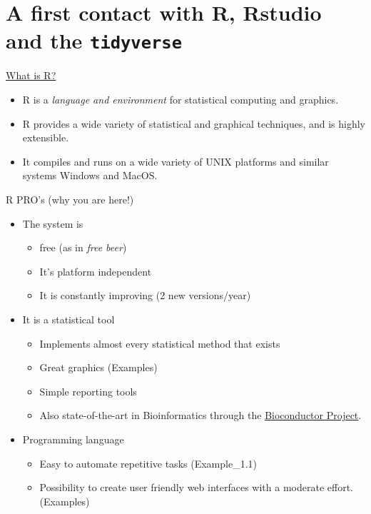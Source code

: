 \documentclass[ignorenonframetext,]{beamer}
\providecommand{\tightlist}{%
  \setlength{\itemsep}{0pt}\setlength{\parskip}{0pt}}
\begin{document}
\section{\texorpdfstring{A first contact with R, Rstudio and the
\texttt{tidyverse}}{A first contact with R, Rstudio and the tidyverse}}\label{a-first-contact-with-r-rstudio-and-the-tidyverse}

\begin{frame}{\href{https://www.r-project.org/about.html}{What is R?}}

\begin{itemize}
\item
  R is a \emph{language and environment} for statistical computing and
  graphics.
\item
  R provides a wide variety of statistical and graphical techniques, and
  is highly extensible.
\item
  It compiles and runs on a wide variety of UNIX platforms and similar
  systems Windows and MacOS.
\end{itemize}

\end{frame}

\begin{frame}{R PRO's (why you are here!)}

\begin{itemize}
\tightlist
\item
  The system is

  \begin{itemize}
  \tightlist
  \item
    free (as in \emph{free beer})
  \item
    It's platform independent
  \item
    It is constantly improving (2 new versions/year)
  \end{itemize}
\item
  It is a statistical tool

  \begin{itemize}
  \tightlist
  \item
    Implements almost every statistical method that exists
  \item
    Great graphics (Examples)
  \item
    Simple reporting tools
  \item
    Also state-of-the-art in Bioinformatics through the
    \href{http://bioconductor.org}{Bioconductor Project}.
  \end{itemize}
\item
  Programming language

  \begin{itemize}
  \tightlist
  \item
    Easy to automate repetitive tasks (Example\_1.1)
  \item
    Possibility to create user friendly web interfaces with a moderate
    effort. (Examples)
  \end{itemize}
\end{itemize}

\end{frame}
\end{document}
